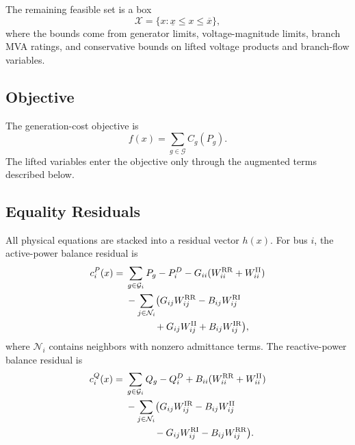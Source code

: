 \documentclass[journal]{IEEEtran}
\newcommand{\RR}{\mathrm{RR}}
\newcommand{\RI}{\mathrm{RI}}
\newcommand{\IR}{\mathrm{IR}}
\newcommand{\II}{\mathrm{II}}
\begin{document}
The remaining feasible set is a box
\begin{equation}
    \mathcal X=\{x:\underline{x}\leq x\leq \overline{x}\},
\end{equation}
where the bounds come from generator limits, voltage-magnitude limits, branch MVA ratings, and conservative bounds on lifted voltage products and branch-flow variables.

\subsection{Objective}
The generation-cost objective is
\begin{equation}
    f(x)=\sum_{g\in\mathcal G} C_g(P_g).
\end{equation}
The lifted variables enter the objective only through the augmented terms described below.

\subsection{Equality Residuals}
All physical equations are stacked into a residual vector $h(x)$. For bus $i$, the active-power balance residual is
\begin{align}
c_i^P(x)={}&\sum_{g\in\mathcal G_i}P_g-P_i^D
    -G_{ii}(W_{ii}^{\RR}+W_{ii}^{\II}) \nonumber\\
&-\sum_{j\in\mathcal N_i}
\bigl(G_{ij}W_{ij}^{\RR}-B_{ij}W_{ij}^{\RI} \nonumber\\
&\hspace{3.0em}
      +G_{ij}W_{ij}^{\II}+B_{ij}W_{ij}^{\IR}\bigr),
\end{align}
where $\mathcal N_i$ contains neighbors with nonzero admittance terms. The reactive-power balance residual is
\begin{align}
c_i^Q(x)={}&\sum_{g\in\mathcal G_i}Q_g-Q_i^D
    +B_{ii}(W_{ii}^{\RR}+W_{ii}^{\II}) \nonumber\\
&-\sum_{j\in\mathcal N_i}
\bigl(G_{ij}W_{ij}^{\IR}-B_{ij}W_{ij}^{\II} \nonumber\\
&\hspace{3.0em}
      -G_{ij}W_{ij}^{\RI}-B_{ij}W_{ij}^{\RR}\bigr).
\end{align}
\end{document}
